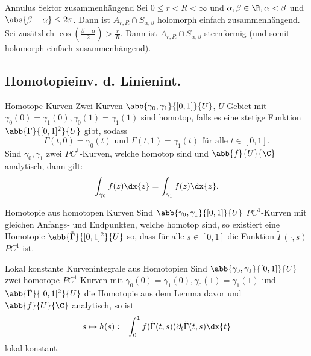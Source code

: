 \begin{karte}{Annulus Sektor zusammenhängend}
    Sei \(0 \leq r < R < \infty \) und \(\alpha, \beta \in \R, \alpha < \beta\) 
    und \( \abs{\beta - \alpha} \leq 2\pi \). Dann ist \(A_{r,R} \cap S_{\alpha, \beta}\) 
    holomorph einfach zusammenhängend.\\
    Sei zusätzlich \( \cos\left( \frac{\beta - \alpha}{2} \right) > \frac{r}{R} \). 
    Dann ist \( A_{r,R} \cap S_{\alpha, \beta} \) sternförmig (und somit holomorph einfach zusammenhängend).
\end{karte}

\subsection{Homotopieinv. d. Linienint.}

\begin{karte}{Homotope Kurven}
    Zwei Kurven \(\abb{\gamma_0, \gamma_1}{[0,1]}{U}\), \(U\) Gebiet 
    mit \(\gamma_0(0) = \gamma_1(0), \gamma_0(1) = \gamma_1(1)\) sind 
    homotop, falls es eine stetige Funktion \(\abb{\Gamma}{[0,1]^2}{U}\) 
    gibt, sodass 
    \[ \Gamma(t,0) = \gamma_0(t) \text{ und } \Gamma(t,1) = \gamma_1(t) 
    \text{ für alle } t\in [0,1]. \]
    Sind \(\gamma_0, \gamma_1\) zwei \(PC^1\)-Kurven, welche homotop sind 
    und \(\abb{f}{U}{\C}\) analytisch, dann gilt: 
    \[ \int_{\gamma_0} f(z) \dx{z} = \int_{\gamma_1} f(z) \dx{z}. \]
\end{karte}

\begin{karte}{Homotopie aus homotopen Kurven}
    Sind \(\abb{\gamma_0, \gamma_1}{[0,1]}{U}\) \(PC^1\)-Kurven mit gleichen 
    Anfangs- und Endpunkten, welche homotop sind, so existiert eine Homotopie 
    \(\abb{\tilde{\Gamma}}{[0,1]^2}{U}\) so, dass für alle \(s \in [0,1]\) 
    die Funktion \(\tilde{\Gamma}(\cdot, s)\) \(PC^1\) ist.
\end{karte}

\begin{karte}{Lokal konstante Kurvenintegrale aus Homotopien}
    Sind \(\abb{\gamma_0, \gamma_1}{[0,1]}{U}\) zwei homotope \(PC^1\)-Kurven 
    mit \(\gamma_0(0) = \gamma_1(0), \gamma_0(1) = \gamma_1(1)\) und 
    \( \abb{\tilde{\Gamma}}{[0,1]^2}{U} \) die Homotopie aus dem Lemma davor 
    und \(\abb{f}{U}{\C}\) analytisch, so ist 
    \[ s \mapsto h(s) := \int_0^1 f(\tilde{\Gamma}(t,s)) \partial_t \tilde{\Gamma}(t,s) \dx{t} \]
    lokal konstant.
\end{karte}

